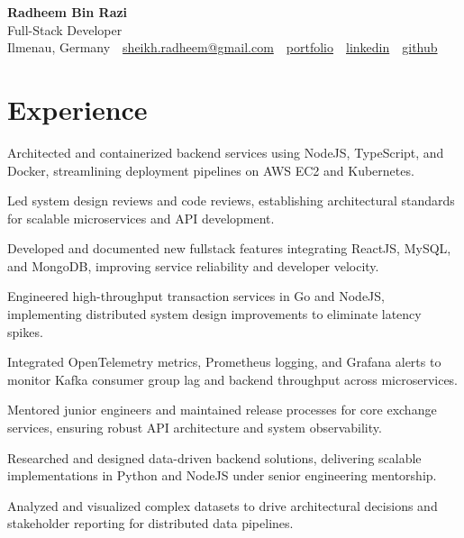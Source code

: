 \documentclass[10pt,a4paper]{resume}
\makeatletter
\newcommand{\Portfolio}{https://radheem.github.io/my-cv}
\newcommand{\PortfolioText}{portfolio}
\newcommand{\GitHub}{https://github.com/radheem}
\newcommand{\LinkedIn}{https://www.linkedin.com/in/radheem-razi}
\newcommand{\Email}{sheikh.radheem@gmail.com}
\makeatother
\begin{document}
\begin{center}
  {\huge\bfseries Radheem Bin Razi}\\[3pt]
  {\large Full-Stack Developer}\\[6pt]
  \small
  Ilmenau, Germany \,\textbar\,
  \href{mailto:\Email}{\Email} \,\textbar\,
  \href{\Portfolio}{\PortfolioText} \,\textbar\,
  \href{\LinkedIn}{linkedin} \,\textbar\,
  \href{\GitHub}{github}
\end{center}
\vspace{2pt}

\section{Experience}

\bullets
  \item Architected and containerized backend services using NodeJS, TypeScript, and Docker, streamlining deployment pipelines on AWS EC2 and Kubernetes.
  \item Led system design reviews and code reviews, establishing architectural standards for scalable microservices and API development.
  \item Developed and documented new fullstack features integrating ReactJS, MySQL, and MongoDB, improving service reliability and developer velocity.
\bulletsend
\vspace{1.5pt}
\bullets
  \item Engineered high-throughput transaction services in Go and NodeJS, implementing distributed system design improvements to eliminate latency spikes.
  \item Integrated OpenTelemetry metrics, Prometheus logging, and Grafana alerts to monitor Kafka consumer group lag and backend throughput across microservices.
  \item Mentored junior engineers and maintained release processes for core exchange services, ensuring robust API architecture and system observability.
\bulletsend
\vspace{1.5pt}
\bullets
  \item Researched and designed data-driven backend solutions, delivering scalable implementations in Python and NodeJS under senior engineering mentorship.
  \item Analyzed and visualized complex datasets to drive architectural decisions and stakeholder reporting for distributed data pipelines.
\bulletsend
\vspace{1.5pt}
\end{document}
